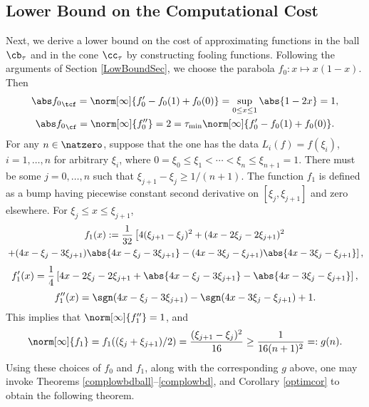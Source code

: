 \subsection{Lower Bound on the Computational Cost}
Next, we derive a lower bound on the cost of approximating functions in the ball $\cb_{\tau}$ and in the cone $\cc_{\tau}$ by constructing fooling functions. Following the arguments of Section \ref{LowBoundSec}, we choose the parabola $f_0: x \mapsto x(1-x)$. Then
\begin{gather*}
\Ftnorm{f_0}=\norm[\infty]{f'_0-f_0(1)+f_0(0)}=\sup_{0 \le x \le 1} \abs{1-2x} = 1, \\ \Fnorm{f_0}=\norm[\infty]{f''_0}=2= \tau_{\min} \norm[\infty]{f'_0-f_0(1)+f_0(0)}.
\end{gather*}
For any $n \in \natzero$, suppose that the one has the data $L_i(f)=f(\xi_i)$, $i=1, \ldots, n$ for arbitrary $\xi_i$, where $0=\xi_0 \le \xi_1 < \cdots < \xi_n \le \xi_{n+1} = 1$.  There must be some $j=0, \ldots, n$ such that $\xi_{j+1} - \xi_j \ge 1/(n+1)$.  The function $f_{1}$ is defined as a bump having piecewise constant second derivative on $[\xi_j, \xi_{j+1}]$ and zero elsewhere.  For $\xi_{j} \le x \leq \xi_{j+1}$,
\begin{multline*}
f_{1}(x):=
\frac{1}{32} \left [4(\xi_{j+1}-\xi_j)^2 + (4x-2\xi_j-2\xi_{j+1})^2  \right. \\
\left. + (4x-\xi_j-3\xi_{j+1})\abs{4x-\xi_j-3\xi_{j+1}} -(4x-3\xi_j-\xi_{j+1})\abs{4x-3\xi_j-\xi_{j+1}} \right],
\end{multline*}
\[
f'_{1}(x)=
\frac{1}{4} \left [4x-2\xi_j-2\xi_{j+1} + \abs{4x-\xi_j-3\xi_{j+1}} -\abs{4x-3\xi_j-\xi_{j+1}} \right],
\]
\[
f''_{1}(x)=\sgn(4x-\xi_j-3\xi_{j+1}) - \sgn(4x-3\xi_j-\xi_{j+1}) + 1.
\]
This implies that $\norm[\infty]{f''_1}=1$, and
\[
\norm[\infty]{f_1}=f_1((\xi_j+\xi_{j+1})/2)= \frac{(\xi_{j+1} - \xi_j)^2}{16} \ge \frac{1}{16(n+1)^2} =: g(n).
\]
Using these choices of $f_0$ and $f_1$, along with the corresponding $g$ above, one may invoke Theorems \ref{complowbdball}--\ref{complowbd}, and Corollary \ref{optimcor} to obtain the following theorem.

